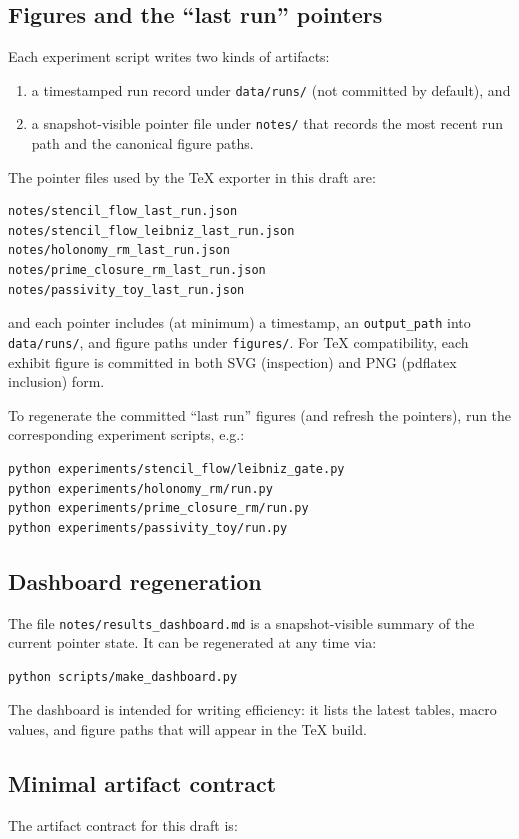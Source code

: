 \subsection{Figures and the ``last run'' pointers}
Each experiment script writes two kinds of artifacts:
\begin{enumerate}
  \item a timestamped run record under \texttt{data/runs/} (not committed by default), and
  \item a snapshot-visible pointer file under \texttt{notes/} that records the most recent run path and the canonical figure paths.
\end{enumerate}
The pointer files used by the TeX exporter in this draft are:
\begin{verbatim}
notes/stencil_flow_last_run.json
notes/stencil_flow_leibniz_last_run.json
notes/holonomy_rm_last_run.json
notes/prime_closure_rm_last_run.json
notes/passivity_toy_last_run.json
\end{verbatim}
and each pointer includes (at minimum) a timestamp, an \texttt{output\_path} into \texttt{data/runs/}, and figure paths under \texttt{figures/}.
For TeX compatibility, each exhibit figure is committed in both SVG (inspection) and PNG (pdflatex inclusion) form.

To regenerate the committed ``last run'' figures (and refresh the pointers), run the corresponding experiment scripts, e.g.:
\begin{verbatim}
python experiments/stencil_flow/leibniz_gate.py
python experiments/holonomy_rm/run.py
python experiments/prime_closure_rm/run.py
python experiments/passivity_toy/run.py
\end{verbatim}

\subsection{Dashboard regeneration}
The file \texttt{notes/results\_dashboard.md} is a snapshot-visible summary of the current pointer state.
It can be regenerated at any time via:
\begin{verbatim}
python scripts/make_dashboard.py
\end{verbatim}
The dashboard is intended for writing efficiency: it lists the latest tables, macro values, and figure paths that will appear in the TeX build.

\subsection{Minimal artifact contract}
The artifact contract for this draft is:

